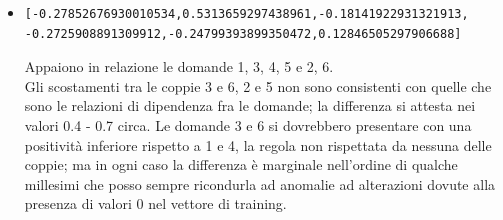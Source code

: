\begin{itemize}
\item \begin{verbatim}[-0.27852676930010534,0.5313659297438961,-0.18141922931321913,
-0.2725908891309912,-0.24799393899350472,0.12846505297906688]
\end{verbatim}
Appaiono in relazione le domande 1, 3, 4, 5 e  2, 6.\\
Gli scostamenti tra le coppie 3 e 6, 2 e 5 non sono consistenti con quelle che sono le relazioni di dipendenza fra le domande; la differenza si attesta nei valori 0.4 - 0.7 circa. 
Le domande 3 e 6 si dovrebbero presentare con una positivit\`a inferiore rispetto a 1 e 4, la regola  non rispettata da nessuna delle coppie; ma in ogni caso la differenza \`e marginale  nell'ordine di qualche millesimi che posso sempre ricondurla ad anomalie ad alterazioni dovute alla presenza di valori 0 nel vettore di training.
\end{itemize}


